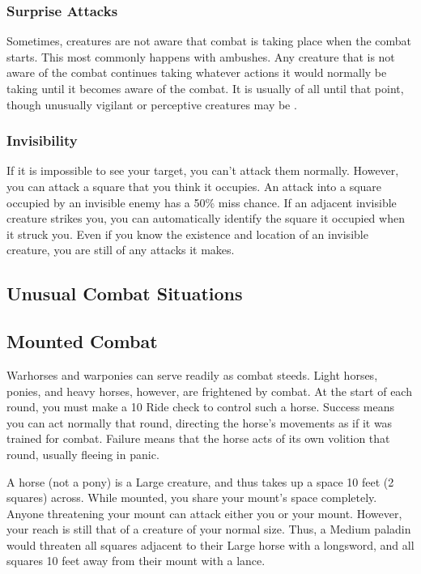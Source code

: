         \subsubsection{Surprise Attacks}\label{Surprise Attacks}
            Sometimes, creatures are not aware that combat is taking place when the combat starts.
            This most commonly happens with ambushes.
            Any creature that is not aware of the combat continues taking whatever actions it would normally be taking until it becomes aware of the combat.
            It is usually  of all until that point, though unusually vigilant or perceptive creatures may be .

        \subsubsection{Invisibility}\label{Invisibility}
            If it is impossible to see your target, you can't attack them normally.
            However, you can attack a square that you think it occupies.
            An attack into a square occupied by an invisible enemy has a 50\% miss chance.
            If an adjacent invisible creature strikes you, you can automatically identify the square it occupied when it struck you.
            Even if you know the existence and location of an invisible creature, you are still  of any attacks it makes.

    \subsection{Unusual Combat Situations}

        \subsection{Mounted Combat}\label{Mounted Combat}
             Warhorses and warponies can serve readily as combat steeds. Light horses, ponies, and heavy horses, however, are frightened by combat.
            At the start of each round, you must make a  10 Ride check to control such a horse.
            Success means you can act normally that round, directing the horse's movements as if it was trained for combat.
            Failure means that the horse acts of its own volition that round, usually fleeing in panic.

             A horse (not a pony) is a Large creature, and thus takes up a space 10 feet (2 squares) across. While mounted, you share your mount's space completely. Anyone threatening your mount can attack either you or your mount. However, your reach is still that of a creature of your normal size. Thus, a Medium paladin would threaten all squares adjacent to their Large horse with a longsword, and all squares 10 feet away from their mount with a lance.

